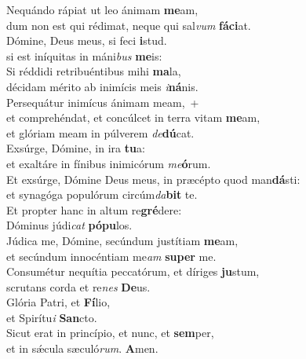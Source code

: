 \evenverse Nequándo rápiat ut leo ánimam \textbf{me}am,~\*\\
\evenverse dum non est qui rédimat, neque qui sal\textit{vum} \textbf{fá}\textbf{ci}at.\\
\oddverse Dómine, Deus meus, si feci \textbf{i}stud.~\*\\
\oddverse si est iníquitas in máni\textit{bus} \textbf{me}is:\\
\evenverse Si réddidi retribuéntibus mihi \textbf{ma}la,~\*\\
\evenverse décidam mérito ab inimícis meis \textit{i}\textbf{ná}nis.\\
\oddverse Persequátur inimícus ánimam meam,~+\\
\oddverse  et comprehéndat, et concúlcet in terra vitam \textbf{me}am,~\*\\
\oddverse et glóriam meam in púlverem \textit{de}\textbf{dú}cat.\\
\evenverse Exsúrge, Dómine, in ira \textbf{tu}a:~\*\\
\evenverse et exaltáre in fínibus inimicórum \textit{me}\textbf{ó}rum.\\
\oddverse Et exsúrge, Dómine Deus meus, in præcépto quod man\textbf{dá}sti:~\*\\
\oddverse et synagóga populórum circúm\textit{da}\textbf{bit} te.\\
\evenverse Et propter hanc in altum re\textbf{gré}dere:~\*\\
\evenverse Dóminus júdi\textit{cat} \textbf{pó}\textbf{pu}los.\\
\oddverse Júdica me, Dómine, secúndum justítiam \textbf{me}am,~\*\\
\oddverse et secúndum innocéntiam me\textit{am} \textbf{su}\textbf{per} me.\\
\evenverse Consumétur nequítia peccatórum, et díriges \textbf{ju}stum,~\*\\
\evenverse scrutans corda et re\textit{nes} \textbf{De}us.\\
\oddverse Glória Patri, et \textbf{Fí}lio,~\*\\
\oddverse et Spirítu\textit{i} \textbf{San}cto.\\
\evenverse Sicut erat in princípio, et nunc, et \textbf{sem}per,~\*\\
\evenverse et in sǽcula sæculó\textit{rum}. \textbf{A}men.\\

